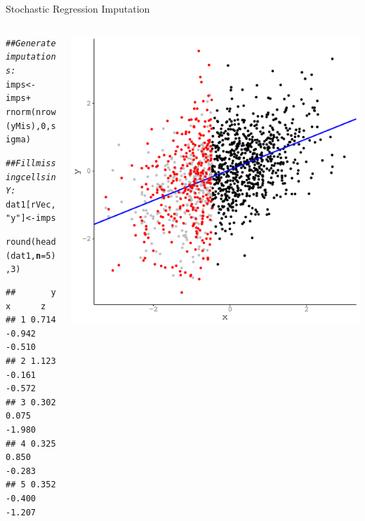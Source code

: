\documentclass{beamer}\usepackage[]{graphicx}\usepackage[]{color}
\makeatletter
\newcommand{\hlnum}[1]{\textcolor[rgb]{0.69,0.494,0}{#1}}%
\newcommand{\hlstr}[1]{\textcolor[rgb]{0.749,0.012,0.012}{#1}}%
\newcommand{\hlcom}[1]{\textcolor[rgb]{0.514,0.506,0.514}{\textit{#1}}}%
\newcommand{\hlopt}[1]{\textcolor[rgb]{0,0,0}{#1}}%
\newcommand{\hlstd}[1]{\textcolor[rgb]{0,0,0}{#1}}%
\newcommand{\hlkwb}[1]{\textcolor[rgb]{0,0.341,0.682}{#1}}%
\newcommand{\hlkwc}[1]{\textcolor[rgb]{0,0,0}{\textbf{#1}}}%
\newcommand{\hlkwd}[1]{\textcolor[rgb]{0.004,0.004,0.506}{#1}}%
\newenvironment{kframe}{%
 \def\at@end@of@kframe{}%
 \ifinner\ifhmode%
  \def\at@end@of@kframe{\end{minipage}}%
  \begin{minipage}{\columnwidth}%
 \fi\fi%
 \def\FrameCommand##1{\hskip\@totalleftmargin \hskip-\fboxsep
 \colorbox{shadecolor}{##1}\hskip-\fboxsep
     \hskip-\linewidth \hskip-\@totalleftmargin \hskip\columnwidth}%
 \MakeFramed {\advance\hsize-\width
   \@totalleftmargin\z@ \linewidth\hsize
   \@setminipage}}%
 {\par\unskip\endMakeFramed%
 \at@end@of@kframe}
\newenvironment{knitrout}{}{} %
\makeatother
\begin{document}
\begin{frame}[fragile]{Stochastic Regression Imputation}
   
\begin{columns}
\begin{column}{0.52\textwidth}
  
\begin{knitrout}\footnotesize
{}\color{fgcolor}\begin{kframe}
\begin{alltt}
\hlcom{## Generate imputations:}
\hlstd{imps} \hlkwb{<-} \hlstd{imps} \hlopt{+}
    \hlkwd{rnorm}\hlstd{(}\hlkwd{nrow}\hlstd{(yMis),} \hlnum{0}\hlstd{, sigma)}

\hlcom{## Fill missing cells in Y:}
\hlstd{dat1[rVec,} \hlstr{"y"}\hlstd{]} \hlkwb{<-} \hlstd{imps}

\hlkwd{round}\hlstd{(}\hlkwd{head}\hlstd{(dat1,} \hlkwc{n} \hlstd{=} \hlnum{5}\hlstd{),} \hlnum{3}\hlstd{)}
\end{alltt}
\begin{verbatim}
##       y      x      z
## 1 0.714 -0.942 -0.510
## 2 1.123 -0.161 -0.572
## 3 0.302  0.075 -1.980
## 4 0.325  0.850 -0.283
## 5 0.352 -0.400 -1.207
\end{verbatim}
\end{kframe}
\end{knitrout}

\end{column}
\begin{column}{0.5\textwidth}
  
\begin{knitrout}\footnotesize
{}\color{fgcolor}

{\centering \includegraphics[width=0.9\linewidth]{figure/unnamed-chunk-43-1} 

}
\end{knitrout}
\end{column}
\end{columns}
\end{frame}
\end{document}
